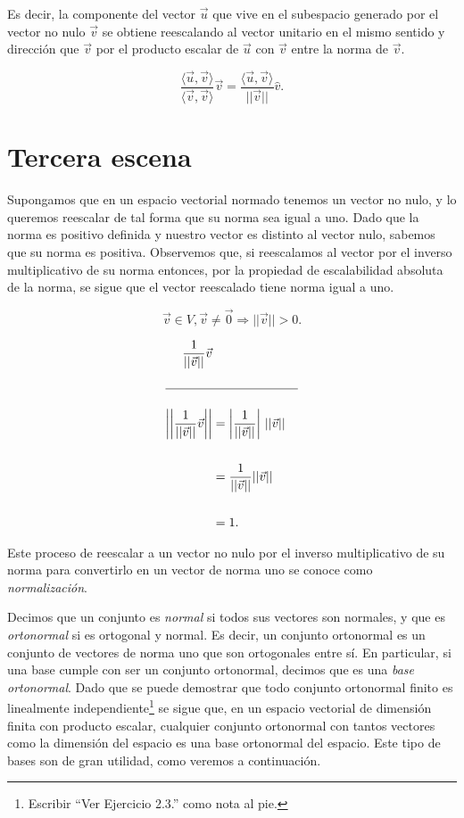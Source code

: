 \documentclass[12pt,dvipsnames]{article}
\numberwithin{equation}{section}
\begin{document}
\noindent Es decir, la componente del vector $\vec{u}$ que vive en el subespacio generado por el vector no nulo $\vec{v}$ se obtiene reescalando al vector unitario en el mismo sentido y dirección que $\vec{v}$ por el producto escalar de $\vec{u}$ con $\vec{v}$ entre la norma de $\vec{v}$.

\[
    \frac{\langle \vec{u} , \vec{v} \rangle}{\langle \vec{v} , \vec{v} \rangle} \vec{v} = \frac{\langle \vec{u} , \vec{v} \rangle}{||\vec{v}||} \hat{v}.
\] 


\newpage
\section{Tercera escena}

Supongamos que en un espacio vectorial normado tenemos un vector no nulo, y lo queremos reescalar de tal forma que su norma sea igual a uno. Dado que la norma es positivo definida y nuestro vector es distinto al vector nulo, sabemos que su norma es positiva. Observemos que, si reescalamos al vector por el inverso multiplicativo de su norma entonces, por la propiedad de escalabilidad absoluta de la norma, se sigue que el vector reescalado tiene norma igual a uno. 

\[
    \vec{v}\in V, \vec{v}\neq \vec{0} \Rightarrow ||\vec{v}||>0.
\] 

\begin{align*}
                \frac{1}{||\vec{v}||} \vec{v} \\ \\
                \hline \\
                \bigg|\bigg|\frac{1}{||\vec{v}||} \vec{v} \bigg|\bigg| &= \bigg| \frac{1}{||\vec{v}||} \bigg| \ ||\vec{v}|| \\ \\
                                                                       &= \frac{1}{||\vec{v}||} ||\vec{v}|| \\ \\
                                                                       &=1.
\end{align*}

\noindent Este proceso de reescalar a un vector no nulo por el inverso multiplicativo de su norma para convertirlo en un vector de norma uno se conoce como \emph{normalización}.

Decimos que un conjunto es \emph{normal} si todos sus vectores son normales, y que es \emph{ortonormal} si es ortogonal y normal. Es decir, un conjunto ortonormal es un conjunto de vectores de norma uno que son ortogonales entre sí. En particular, si una base cumple con ser un conjunto ortonormal, decimos que es una \emph{base ortonormal}. Dado que se puede demostrar que todo conjunto ortonormal finito es linealmente independiente\footnote{Escribir ``Ver Ejercicio 2.3.'' como nota al pie.} se sigue que, en un espacio vectorial de dimensión finita con producto escalar, cualquier conjunto ortonormal con tantos vectores como la dimensión del espacio es una base ortonormal del espacio. Este tipo de bases son de gran utilidad, como veremos a continuación.
\end{document}
